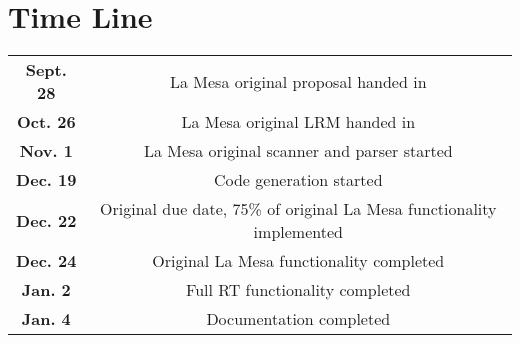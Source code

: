\section{Time Line}
\begin{table}[here]
\begin{tabular} {c c}
\textbf{Sept. 28} & La Mesa original proposal handed in \\
\textbf{Oct. 26} &  La Mesa original LRM handed in\\
\textbf{Nov. 1} & La Mesa original scanner and parser started \\
\textbf{Dec. 19} & Code generation started \\
\textbf{Dec. 22} & Original due date, 75\% of original La Mesa functionality implemented \\
\textbf{Dec. 24} & Original La Mesa functionality completed \\
\textbf{Jan. 2} & Full RT functionality completed \\
\textbf{Jan. 4} & Documentation completed 
\end{tabular}
\end{table}

